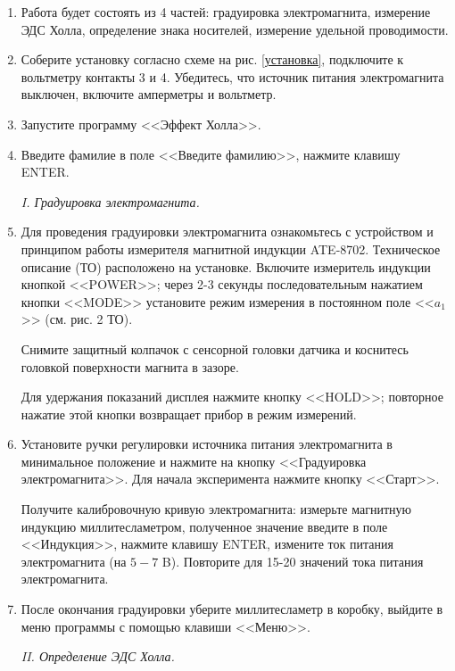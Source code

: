 \documentclass[a4paper,12pt]{article} %
\begin{document}
\begin{enumerate} 
	\item Работа будет состоять из 4 частей: градуировка электромагнита, измерение ЭДС Холла, определение знака носителей, измерение удельной проводимости.
  \item Соберите установку согласно схеме на рис. \ref{установка}, подключите к вольтметру контакты 3 и 4. Убедитесь, что источник питания электромагнита выключен, включите амперметры и вольтметр.
  \item Запустите программу <<Эффект Холла>>.
  \item Введите фамилие в поле <<Введите фамилию>>, нажмите клавишу ENTER.
  
\begin{center}
\textit{I. Градуировка электромагнита.}
\end{center}
  
  \item Для проведения градуировки электромагнита ознакомьтесь с устройством и принципом работы измерителя магнитной индукции ATE-8702. Техническое описание (ТО) расположено на установке.
  Включите измеритель индукции кнопкой <<POWER>>; через 2-3 секунды последовательным нажатием кнопки <<MODE>> установите режим измерения в постоянном поле  <<$a_1$>> (см. рис. 2 ТО).
  
  Снимите защитный колпачок с сенсорной головки датчика и коснитесь головкой поверхности магнита в зазоре.
  
  Для удержания показаний дисплея нажмите кнопку <<HOLD>>; повторное нажатие этой кнопки возвращает прибор в режим измерений.
  
  \item Установите ручки регулировки источника питания электромагнита в минимальное положение и нажмите на кнопку <<Градуировка электромагнита>>. Для начала эксперимента нажмите кнопку  <<Старт>>.
  
   Получите калибровочную кривую электромагнита: измерьте магнитную индукцию миллитесламетром, полученное значение введите в поле  <<Индукция>>, нажмите клавишу ENTER, измените ток питания электромагнита (на $5-7$ B). Повторите для 15-20 значений тока питания электромагнита.
   \item После окончания градуировки уберите миллитесламетр в коробку, выйдите в меню программы с помощью клавиши <<Меню>>.
   
\begin{center}
\textit{II. Определение ЭДС Холла.}
\end{center}   
   

\end{enumerate}
\end{document}
